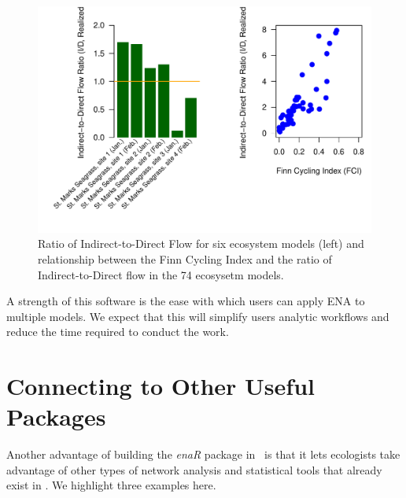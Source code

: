 \documentclass[article]{jss}
\newcommand{\R}{\proglang{R}}
\begin{document}
\begin{Schunk}
\end{Schunk}


\begin{figure}
  \center
\includegraphics{enaR-vignette-052}
\caption{Ratio of Indirect-to-Direct Flow for six ecosystem models
  (left) and relationship between the Finn Cycling Index and the ratio
  of Indirect-to-Direct flow in the 74 ecosysetm models.} \label{fig:idf}
\end{figure}

A strength of this software is the ease with which users can apply ENA
to multiple models.  We expect that this will simplify users
analytic workflows and reduce the time required to conduct the work.


\section{Connecting to Other Useful Packages}
Another advantage of building the \textit{enaR} package in \R\ is that
it lets ecologists take advantage of other types of network analysis
and statistical tools that already exist in \R.  We highlight three
examples here.
\end{document}
